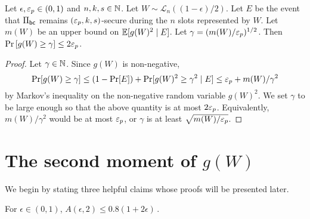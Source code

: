 \begin{lemma}\label{lemma:praos-tail-gamma}
  Let $\epsilon, \mathsf{\varepsilon}_p \in (0, 1)$ and $n, k, s \in \mathbb{N}$. 
  Let $W \sim \mathcal{L}_n((1-\epsilon)/2)$.
  Let $E$ be the event that 
  $\Pi_\mathsf{bc}$ remains $(\mathsf{\varepsilon}_p, k, s)$-secure during 
  the $n$ slots represented by $W$. 
  Let $m(W)$ be an upper bound on $\operatorname{\mathbb{E}}[ g(W)^2 \mid E]$.
  Let $\gamma = (m(W)/\mathsf{\varepsilon}_p)^{1/2}$.
  Then 
  $
      \Pr\left[g(W) \geq \gamma\right] \leq 2 \mathsf{\varepsilon}_p
  $.
\end{lemma}
\begin{proof}
  Let $\gamma \in \mathbb{N}$. 
  Since $g(W)$ is non-negative, 
  $$
    \Pr[g(W) \geq \gamma]
    \leq (1 - \Pr[E]) + \Pr[g(W)^2 \geq \gamma^2 \mid E] 
    \leq \mathsf{\varepsilon}_p + m(W)/\gamma^2
  $$ 
  by Markov's inequality on the non-negative random variable $g(W)^2$. 
  We set $\gamma$ to be large enough so that the above quantity is at most $2 \mathsf{\varepsilon}_p$. 
  Equivalently, 
  $m(W)/\gamma^2$ would be at most $\mathsf{\varepsilon}_p$, 
  or $\gamma$ is at least $\sqrt{m(W)/\mathsf{\varepsilon}_p}$. 
\end{proof}


\section{The second moment of \texorpdfstring{$g(W)$}{the grinding power}}

We begin by stating three helpful claims 
whose proofs will be presented later.

\begin{claim}\label{claim:multiple-honest-blocks}
  For $\epsilon \in (0, 1)$, 
  $
    A(\epsilon, 2) 
    \leq 0.8 (1 + 2 \epsilon)
    \,.
  $
\end{claim}





